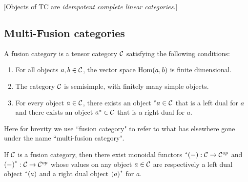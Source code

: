 \documentclass{amsart}
\begin{document}
[Objects of TC are \emph{idempotent complete linear categories}.]


\subsection{Multi-Fusion categories} \label{sec-tc-fusion}


\begin{definition}
A fusion category is a tensor category $\mathcal C$ satisfying the following conditions:
\begin{enumerate}
\item For all objects $a, b \in \mathcal C$, the vector space $\operatorname{Hom}(a,b)$ is finite dimensional.
\item The category $\mathcal C$ is semisimple, with finitely many simple objects.
\item For every object $a \in \mathcal C$, there exists an object ${}^*{a} \in \mathcal C$ that is a left dual for $a$ and there exists an object ${a}^* \in \mathcal C$ that is a right dual for $a$.
\end{enumerate}
\end{definition}


\begin{remark}
Here for brevity we use ``fusion category" to refer to what has elsewhere gone under the name ``multi-fusion category".
\end{remark}

\begin{proposition}
If $\mathcal C$ is a fusion category, then there exist monoidal functors ${}^*{(-)} : \mathcal C \rightarrow \mathcal C^{op}$ and ${(-)}^* : \mathcal C \rightarrow \mathcal C^{op}$ whose values on any object $a \in \mathcal C$ are respectively a left dual object ${}^*{(a)}$ and a right dual object ${(a)}^*$ for $a$.
\end{proposition}
\end{document}
